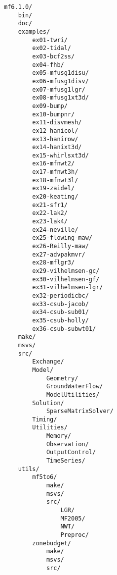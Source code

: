 \begin{verbatim}
mf6.1.0/ 
    bin/ 
    doc/ 
    examples/ 
        ex01-twri/ 
        ex02-tidal/ 
        ex03-bcf2ss/ 
        ex04-fhb/ 
        ex05-mfusg1disu/ 
        ex06-mfusg1disv/ 
        ex07-mfusg1lgr/ 
        ex08-mfusg1xt3d/ 
        ex09-bump/ 
        ex10-bumpnr/ 
        ex11-disvmesh/ 
        ex12-hanicol/ 
        ex13-hanirow/ 
        ex14-hanixt3d/ 
        ex15-whirlsxt3d/ 
        ex16-mfnwt2/ 
        ex17-mfnwt3h/ 
        ex18-mfnwt3l/ 
        ex19-zaidel/ 
        ex20-keating/ 
        ex21-sfr1/ 
        ex22-lak2/ 
        ex23-lak4/ 
        ex24-neville/ 
        ex25-flowing-maw/ 
        ex26-Reilly-maw/ 
        ex27-advpakmvr/ 
        ex28-mflgr3/ 
        ex29-vilhelmsen-gc/ 
        ex30-vilhelmsen-gf/ 
        ex31-vilhelmsen-lgr/ 
        ex32-periodicbc/ 
        ex33-csub-jacob/ 
        ex34-csub-sub01/ 
        ex35-csub-holly/ 
        ex36-csub-subwt01/ 
    make/ 
    msvs/ 
    src/ 
        Exchange/ 
        Model/ 
            Geometry/ 
            GroundWaterFlow/ 
            ModelUtilities/ 
        Solution/ 
            SparseMatrixSolver/ 
        Timing/ 
        Utilities/ 
            Memory/ 
            Observation/ 
            OutputControl/ 
            TimeSeries/ 
    utils/ 
        mf5to6/ 
            make/ 
            msvs/ 
            src/ 
                LGR/ 
                MF2005/ 
                NWT/ 
                Preproc/ 
        zonebudget/ 
            make/ 
            msvs/ 
            src/ 
\end{verbatim}
